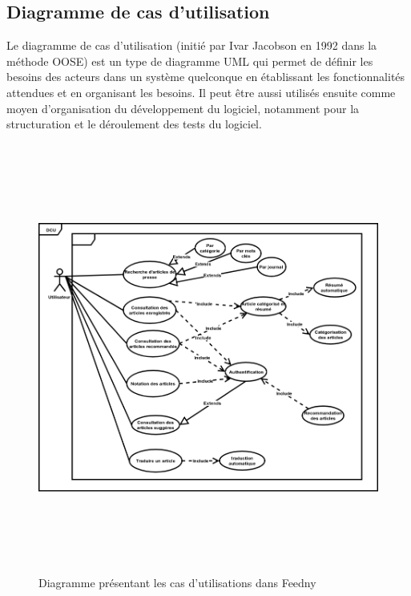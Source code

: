 \subsection{Diagramme de cas d'utilisation}
\textquotedbl Le diagramme de cas d'utilisation (initié par Ivar Jacobson en 1992 dans la méthode OOSE) est un type de diagramme UML qui permet de définir les besoins des acteurs dans un système quelconque en établissant les fonctionnalités attendues et en organisant les besoins. Il peut être aussi utilisés ensuite comme moyen d'organisation du développement du logiciel, notamment pour la structuration et le déroulement des tests du logiciel\textquotedbl\text{ }\cite{UML}.
\begin{figure}[H]
    \centering
    \includegraphics[height=400pt,width=350pt]{img/chapter3/diagcasdutilisation.png}
    \caption{Diagramme présentant les cas d'utilisations dans \textquotedbl Feedny\textquotedbl }
\end{figure}

